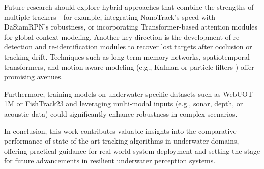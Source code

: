 Future research should explore hybrid approaches that combine the strengths of multiple trackers—for example, integrating NanoTrack's speed with DaSiamRPN's robustness, or incorporating Transformer-based attention modules for global context modeling. Another key direction is the development of re-detection and re-identification modules to recover lost targets after occlusion or tracking drift. Techniques such as long-term memory networks, spatiotemporal transformers, and motion-aware modeling (e.g., Kalman or particle filters \cite{zhang2024webuot}) offer promising avenues.

Furthermore, training models on underwater-specific datasets such as WebUOT-1M \cite{zhang2024webuot} or FishTrack23 \cite{elmezain2025advancing} and leveraging multi-modal inputs (e.g., sonar, depth, or acoustic data) could significantly enhance robustness in complex scenarios.

In conclusion, this work contributes valuable insights into the comparative performance of state-of-the-art tracking algorithms in underwater domains, offering practical guidance for real-world system deployment and setting the stage for future advancements in resilient underwater perception systems.